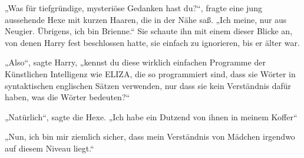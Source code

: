 „Was für tiefgründige, mysteriöse Gedanken hast du?“, fragte eine jung aussehende Hexe mit kurzen Haaren, die in der Nähe saß. „Ich meine, nur aus Neugier. Übrigens, ich bin Brienne.“
Sie schaute ihn mit einem dieser Blicke an, von denen Harry fest beschlossen hatte, sie einfach zu ignorieren, bis er älter war.

„Also“, sagte Harry, „kennst du diese wirklich einfachen Programme der Künstlichen Intelligenz wie ELIZA, die so programmiert sind, dass sie Wörter in syntaktischen englischen Sätzen verwenden, nur dass sie kein Verständnis dafür haben, was die Wörter bedeuten?“

„Natürlich“, sagte die Hexe. „Ich habe ein Dutzend von ihnen in meinem Koffer“

„Nun, ich bin mir ziemlich sicher, dass mein Verständnis von Mädchen irgendwo auf diesem Niveau liegt.“



